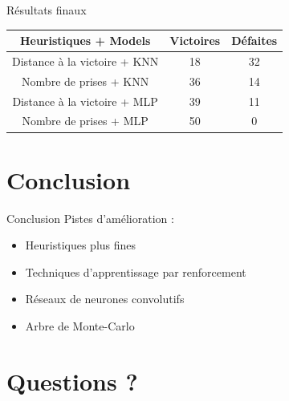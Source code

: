 \documentclass{beamer}
\begin{document}
\begin{frame}{Résultats finaux}
    \begin{center}
        \begin{tabular}{ | c || c | c |}
            \hline
            Heuristiques + Models        & Victoires & Défaites \\
            \hline
            \hline
            Distance à la victoire + KNN & 18        & 32       \\
            Nombre de prises + KNN       & 36        & 14       \\
            Distance à la victoire + MLP & 39        & 11       \\
            Nombre de prises + MLP       & 50        & 0        \\ \hline
        \end{tabular}

    \end{center}
\end{frame}


{\section*{Conclusion}}

\begin{frame}{Conclusion}
    Pistes d'amélioration :
    \begin{itemize}
        \item Heuristiques plus fines
        \item Techniques d'apprentissage par renforcement
        \item Réseaux de neurones convolutifs
        \item Arbre de Monte-Carlo
    \end{itemize}
\end{frame}

\appendix

{\section*{Questions ?}}
\end{document}
